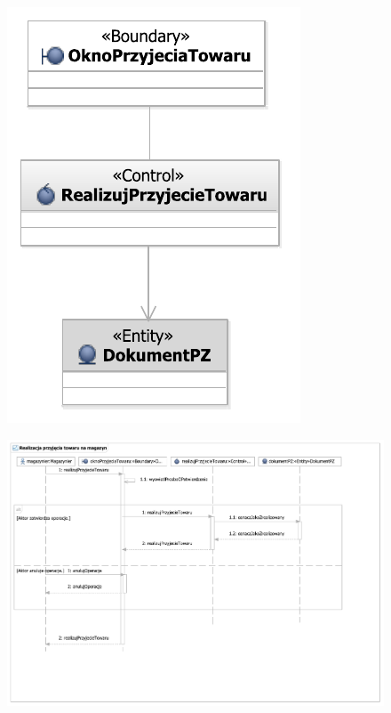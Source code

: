 \begin{figure}[H]
  \centering
  \includegraphics[angle=\ecbangle, scale=\ecbscale]{../img/usecase/pu27ecb.pdf}
  \caption{}
\end{figure}

\begin{figure}[H]
  \centering
  \includegraphics[angle=\seqangle, scale=\seqscale]{../img/usecase/pu27seq.pdf}
  \caption{}
\end{figure}
\newpage

